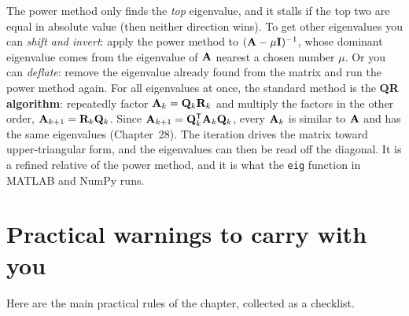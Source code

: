 \begin{remark}
The power method only finds the \emph{top} eigenvalue, and it stalls if the top two are
equal in absolute value (then neither direction wins). To get other eigenvalues you can
\emph{shift and invert}: apply the power method to $(\mathbf{A}-\mu\mathbf{I})^{-1}$, whose
dominant eigenvalue comes from the eigenvalue of $\mathbf{A}$ nearest a chosen number
$\mu$. Or you can \emph{deflate}: remove the eigenvalue already found from the matrix
and run the power method again. For all eigenvalues at once, the standard method is the
\textbf{QR algorithm}: repeatedly factor $\mathbf{A}_k=\mathbf{Q}_k\mathbf{R}_k$ and multiply the
factors in the other order, $\mathbf{A}_{k+1}=\mathbf{R}_k\mathbf{Q}_k$. Since
$\mathbf{A}_{k+1}=\mathbf{Q}_k^{\mathsf{T}}\mathbf{A}_k\mathbf{Q}_k$, every $\mathbf{A}_k$ is similar to $\mathbf{A}$
and has the same eigenvalues (Chapter~28). The iteration drives the matrix toward
upper-triangular form, and the eigenvalues can then be read off the diagonal. It is a
refined relative of the power method, and it is what the \texttt{eig} function in
MATLAB and NumPy runs.
\end{remark}

\section{Practical warnings to carry with you}

Here are the main practical rules of the chapter, collected as a checklist.


